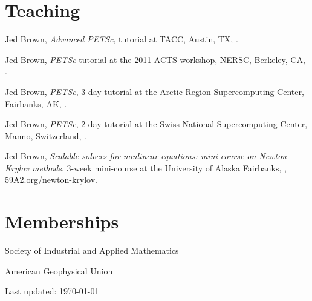 \documentclass[10pt,letterpaper]{article}
\newcommand\ptitle[1]{\textit{#1}} %
\renewenvironment{itemize}{
  \begin{list}{}{
    \setlength{\leftmargin}{1.5em}
    \setlength{\itemsep}{0.25em}
    \setlength{\parskip}{0pt}
    \setlength{\parsep}{0.25em}
  }
}{
  \end{list}
}
\begin{document}
\section*{Teaching}
\begin{itemize}
\item Jed Brown, \ptitle{Advanced PETSc}, tutorial at TACC, Austin, TX, .
\item Jed Brown, \ptitle{PETSc} tutorial at the 2011 ACTS workshop, NERSC, Berkeley, CA, .
\item Jed Brown, \ptitle{PETSc}, 3-day tutorial at the Arctic Region Supercomputing Center, Fairbanks, AK, .
\item Jed Brown, \ptitle{PETSc}, 2-day tutorial at the Swiss National Supercomputing Center, Manno, Switzerland, .
\item Jed Brown, \ptitle{Scalable solvers for nonlinear equations: mini-course on Newton-Krylov methods}, 3-week mini-course at the University of Alaska Fairbanks, , \href{http://59A2.org/newton-krylov/}{\url{59A2.org/newton-krylov}}.
\end{itemize}

\section*{Memberships}
\begin{itemize}
\item Society of Industrial and Applied Mathematics
\item American Geophysical Union
\end{itemize}


\begin{center}
  \begin{small}
    Last updated: \today
  \end{small}
\end{center}
\end{document}
